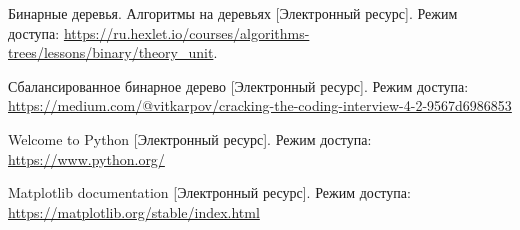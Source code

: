 \renewcommand\bibname{\hfill{\centering СПИСОК ИСПОЛЬЗОВАННЫХ ИСТОЧНИКОВ}}
\begin{thebibliography}{}
 Бинарные деревья. Алгоритмы на деревьях [Электронный ресурс]. Режим доступа: \url{https://ru.hexlet.io/courses/algorithms-trees/lessons/binary/theory_unit}.

 Сбалансированное бинарное дерево [Электронный ресурс]. Режим доступа: \url{https://medium.com/@vitkarpov/cracking-the-coding-interview-4-2-9567d6986853}

 Welcome to Python [Электронный ресурс]. Режим доступа: \url{https://www.python.org/}

 Matplotlib documentation [Электронный ресурс]. Режим доступа: \url{https://matplotlib.org/stable/index.html}

\end{thebibliography}